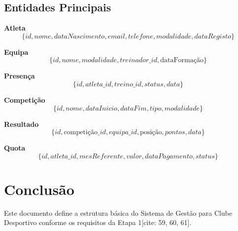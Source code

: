 \documentclass[12pt]{article}
\begin{document}
\subsection{Entidades Principais}

\textbf{Atleta}
\begin{equation*}
\{id, nome, dataNascimento, email, telefone, modalidade, dataRegisto\}
\end{equation*}

\textbf{Equipa}
\begin{equation*}
\{id, nome, modalidade, treinador\_id, \text{dataFormação}\}
\end{equation*}

\textbf{Presença}
\begin{equation*}
\{id, atleta\_id, treino\_id, status, data\}
\end{equation*}

\textbf{Competição}
\begin{equation*}
\{id, nome, dataInicio, dataFim, tipo, modalidade\}
\end{equation*}

\textbf{Resultado}
\begin{equation*}
\{id, \text{competição}\_id, equipa\_id, \text{posição}, pontos, data\}
\end{equation*}

\textbf{Quota}
\begin{equation*}
\{id, atleta\_id, mesReferente, valor, dataPagamento, status\}
\end{equation*}

\section{Conclusão}

Este documento define a estrutura básica do Sistema de Gestão para Clube Desportivo conforme os requisitos da Etapa 1[cite: 59, 60, 61].
\end{document}
